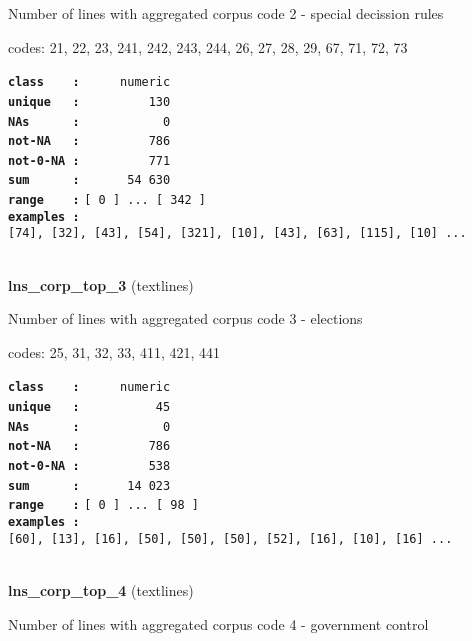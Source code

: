 \documentclass[]{article}
\begin{document}
Number of lines with aggregated corpus code 2 - special decission rules

codes: 21, 22, 23, 241, 242, 243, 244, 26, 27, 28, 29, 67, 71, 72, 73

\textbf{\texttt{class\ \ \ \ :}} \texttt{~~~~~numeric}\\
\textbf{\texttt{unique\ \ \ :}} \texttt{~~~~~~~~~130}\\
\textbf{\texttt{NAs\ \ \ \ \ \ :}} \texttt{~~~~~~~~~~~0}\\
\textbf{\texttt{not-NA\ \ \ :}} \texttt{~~~~~~~~~786}\\
\textbf{\texttt{not-0-NA\ :}} \texttt{~~~~~~~~~771}\\
\textbf{\texttt{sum\ \ \ \ \ \ :}} \texttt{~~~~~~54~630}\\
\textbf{\texttt{range\ \ \ \ :}}
\texttt{{[}\ 0\ {]}\ ...\ {[}\ 342\ {]}}\\
\textbf{\texttt{examples\ :}}
\texttt{{[}74{]},\ {[}32{]},\ {[}43{]},\ {[}54{]},\ {[}321{]},\ {[}10{]},\ {[}43{]},\ {[}63{]},\ {[}115{]},\ {[}10{]}\ ...}\\

~

\textbf{lns\_corp\_top\_3} (textlines)

Number of lines with aggregated corpus code 3 - elections

codes: 25, 31, 32, 33, 411, 421, 441

\textbf{\texttt{class\ \ \ \ :}} \texttt{~~~~~numeric}\\
\textbf{\texttt{unique\ \ \ :}} \texttt{~~~~~~~~~~45}\\
\textbf{\texttt{NAs\ \ \ \ \ \ :}} \texttt{~~~~~~~~~~~0}\\
\textbf{\texttt{not-NA\ \ \ :}} \texttt{~~~~~~~~~786}\\
\textbf{\texttt{not-0-NA\ :}} \texttt{~~~~~~~~~538}\\
\textbf{\texttt{sum\ \ \ \ \ \ :}} \texttt{~~~~~~14~023}\\
\textbf{\texttt{range\ \ \ \ :}}
\texttt{{[}\ 0\ {]}\ ...\ {[}\ 98\ {]}}\\
\textbf{\texttt{examples\ :}}
\texttt{{[}60{]},\ {[}13{]},\ {[}16{]},\ {[}50{]},\ {[}50{]},\ {[}50{]},\ {[}52{]},\ {[}16{]},\ {[}10{]},\ {[}16{]}\ ...}\\

~

\textbf{lns\_corp\_top\_4} (textlines)

Number of lines with aggregated corpus code 4 - government control
\end{document}
